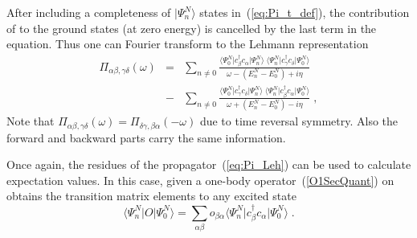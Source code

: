 After including a completeness of $\vert \Psi^N_n \rangle$ states in~(\ref{eq:Pi_t_def}), the contribution of to the ground states (at zero energy) is cancelled by the last term in the equation. Thus one can Fourier transform to the Lehmann representation
\begin{eqnarray}
 \Pi_{\alpha \beta , \gamma \delta}(\omega) &=& 
 \sum_{n \ne 0}  \frac{  {\mbox{$\langle {\Psi^N_0} \vert $}}
            c^{\dag}_\beta c_\alpha {\mbox{$\vert {\Psi^N_n} \rangle$}} \;
             {\mbox{$\langle {\Psi^N_n} \vert $}}
            c^{\dag}_\gamma c_\delta {\mbox{$\vert {\Psi^N_0} \rangle$}} }
            {\omega - \left( E^N_n - E^N_0 \right) + i \eta } 
\nonumber \\
 &-& \sum_{n \ne 0} \frac{  {\mbox{$\langle {\Psi^N_0} \vert $}}
              c^{\dag}_\gamma c_\delta {\mbox{$\vert {\Psi^N_n} \rangle$}} \;
                 {\mbox{$\langle {\Psi^N_n} \vert $}}
             c^{\dag}_\beta c_\alpha {\mbox{$\vert {\Psi^N_0} \rangle$}} }
            {\omega + \left( E^N_n - E^N_0 \right) - i \eta } \; ,
\label{eq:Pi_Leh}
\end{eqnarray}
Note that $\Pi_{\alpha \beta , \gamma \delta}(\omega)=\Pi_{\delta \gamma , \beta \alpha}(-\omega)$ due to time reversal symmetry. Also the forward and backward parts carry the same information.

Once again, the residues of the propagator~(\ref{eq:Pi_Leh}) can be used to calculate expectation values. In this case, given a one-body operator~(\ref{O1SecQuant}) on obtains the transition matrix elements to any excited state
\begin{equation}
 \langle \Psi^N_n \vert O \vert \Psi^N_0 \rangle =
   \sum_{\alpha \beta} o_{\beta \alpha} \langle \Psi^N_n \vert c^\dag_\beta c_\alpha  \vert \Psi^N_0 \rangle  \; .
\end{equation}


%
%
%
%
